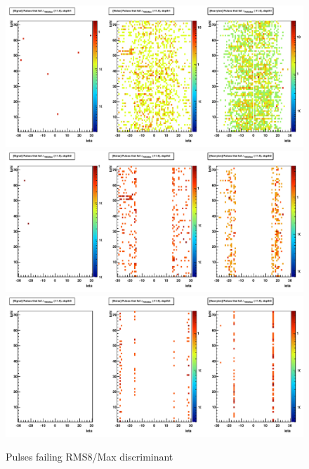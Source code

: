 \begin{figure}
\includegraphics[width=120mm]{DailyLog/6352/6352_Comparison20_Comparison_HFailLambdaRMS8MaxIEtaIPhiDepth1}
\includegraphics[width=120mm]{DailyLog/6352/6352_Comparison20_Comparison_HFailLambdaRMS8MaxIEtaIPhiDepth2}
\includegraphics[width=120mm]{DailyLog/6352/6352_Comparison20_Comparison_HFailLambdaRMS8MaxIEtaIPhiDepth3}
\caption{Pulses failing RMS8/Max discriminant}
\label{Figure_6352_FailRMS8Max_Geometry}
\end{figure}

